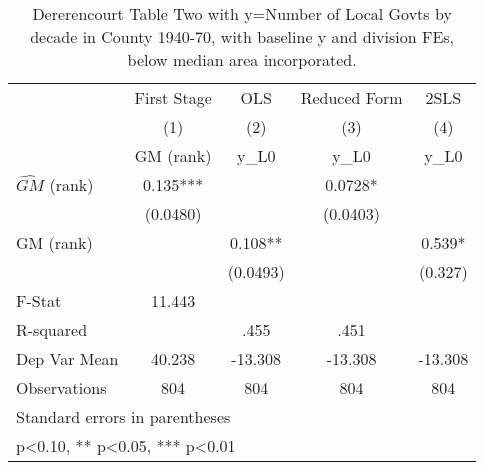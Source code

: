 \begin{table}[htbp]\centering
\def\sym#1{\ifmmode^{#1}\else\(^{#1}\)\fi}
\caption{Dererencourt Table Two with y=Number of Local Govts by decade in County 1940-70, with baseline y and division FEs, below median area incorporated.}
\begin{tabular}{l*{4}{c}}
\toprule
                    & First Stage   &         OLS   &Reduced Form   &        2SLS   \\
                    &\multicolumn{1}{c}{(1)}&\multicolumn{1}{c}{(2)}&\multicolumn{1}{c}{(3)}&\multicolumn{1}{c}{(4)}\\
                    &\multicolumn{1}{c}{GM  (rank)}&\multicolumn{1}{c}{y\_L0}&\multicolumn{1}{c}{y\_L0}&\multicolumn{1}{c}{y\_L0}\\
\midrule
$\hat{GM}$ (rank)   &       0.135***&               &      0.0728*  &               \\
                    &    (0.0480)   &               &    (0.0403)   &               \\
\addlinespace
GM  (rank)          &               &       0.108** &               &       0.539*  \\
                    &               &    (0.0493)   &               &     (0.327)   \\
\midrule
F-Stat              &      11.443   &               &               &               \\
R-squared           &               &        .455   &        .451   &               \\
Dep Var Mean        &      40.238   &     -13.308   &     -13.308   &     -13.308   \\
Observations        &         804   &         804   &         804   &         804   \\
\bottomrule
\multicolumn{5}{l}{\footnotesize Standard errors in parentheses}\\
\multicolumn{5}{l}{\footnotesize * p<0.10, ** p<0.05, *** p<0.01}\\
\end{tabular}
\end{table}
